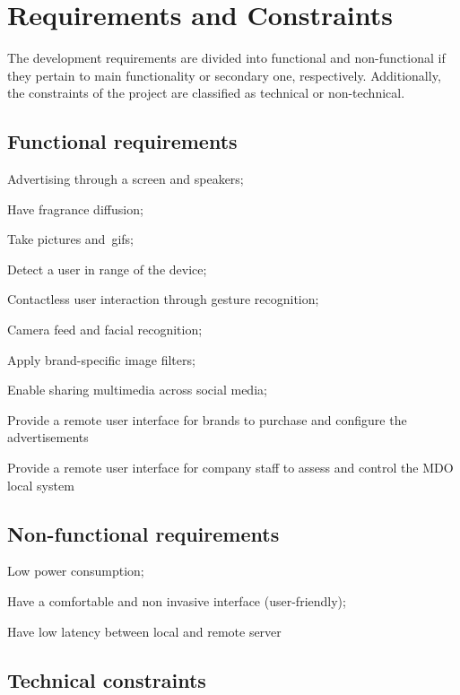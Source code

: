 \section{Requirements and Constraints}
\label{sec:req-const}

The development requirements are divided into functional and non-functional if they pertain to main functionality or secondary one, respectively. Additionally, the constraints of the project are classified as technical or non-technical.

\subsection{Functional requirements}
\label{sec:funct-requ}

\begin{item-c}
\item Advertising through a screen and speakers;
\item Have fragrance diffusion;
\item Take pictures and~\gls{gif}s;
\item Detect a user in range of the device;
\item Contactless user interaction through gesture recognition;
\item Camera feed and facial recognition;
\item Apply brand-specific image filters;
\item Enable sharing multimedia across social media;
\item Provide a remote user interface for brands to purchase and configure the advertisements
\item Provide a remote user interface for company staff to assess and control
  the MDO local system
\end{item-c}
\subsection{Non-functional requirements}
\label{sec:non-funct-requ}

\begin{item-c}
\item Low power consumption;
\item Have a comfortable and non invasive interface (user-friendly);
\item Have low latency between local and remote server
\end{item-c}
\subsection{Technical constraints}
\label{sec:techn-constr}

